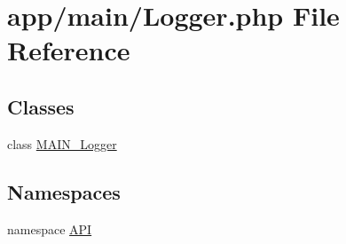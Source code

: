 \hypertarget{Logger_8php}{
\section{app/main/Logger.php File Reference}
\label{d3/d5e/Logger_8php}
}
\subsection*{Classes}
\begin{DoxyCompactItemize}
\item 
class \hyperlink{classMAIN__Logger}{MAIN\_\-Logger}
\end{DoxyCompactItemize}
\subsection*{Namespaces}
\begin{DoxyCompactItemize}
\item 
namespace \hyperlink{namespaceAPI}{API}
\end{DoxyCompactItemize}
